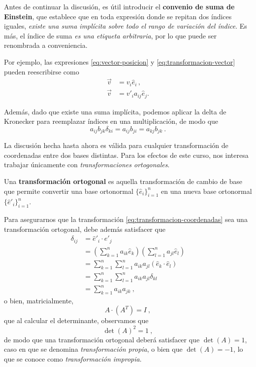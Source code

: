 Antes de continuar la discusión, es útil introducir el  \textbf{convenio de suma de Einstein}, que establece que en toda expresión donde se repitan dos índices iguales, \emph{existe una suma implícita sobre todo el rango de variación del índice}. Es más, el índice de suma \emph{es una etiqueta arbitraria}, por lo que puede ser renombrada a conveniencia.

Por ejemplo, las expresiones \eqref{eq:vector-posicion} y \eqref{eq:transformacion-vector} pueden reescribirse como
\begin{align}
    \vec{v} & = v_i \hat{e}_i \, , \\
    \vec{v} & = v'_i a_{ij} \hat{e}_j .
\end{align}

Además, dado que existe una suma implícita, podemos aplicar la delta de Kronecker para reemplazar índices en una multiplicación, de modo que
\begin{equation}
    a_{ij} b_{jk} \delta_{ki} = a_{ij} b_{ji} = a_{kj} b_{jk} \ .
\end{equation}


La discusión hecha hasta ahora es válida para cualquier transformación de coordenadas entre dos bases distintas. Para los efectos de este curso, nos interesa trabajar únicamente con \emph{transformaciones ortogonales}.

\begin{defi} 
    Una \textbf{transformación ortogonal} es aquella transformación de cambio de base que permite convertir una base ortonormal $\{\hat{e}_i\}_{i=1}^n$ en una nueva base ortonormal $\{\hat{e}'_i\}_{i=1}^n$.
\end{defi}

Para asegurarnos que la transformación \eqref{eq:transformacion-coordenadas} sea una transformación ortogonal, debe además satisfacer que
\begin{align}
    \delta_{ij} & = \hat{e}'_i \cdot \hat{e}'_j \\
    & = \left( \sum_{k=1}^n a_{ik} \hat{e}_k \right) \left( \sum_{l=1}^n a_{jl} \hat{e}_l \right) \\
    & = \sum_{k=1}^n \sum_{l=1}^n a_{ik} a_{jl} (\hat{e}_k \cdot \hat{e}_l) \\
    & = \sum_{k=1}^n \sum_{l=1}^n a_{ik} a_{jl} \delta_{kl} \\
    & = \sum_{k=1}^n a_{ik} a_{jk} \ , \label{eq:delta-transformacion-ortogonal}
\end{align}
o bien, matricialmente,
\begin{equation}\label{eq:condicion-matricial}
    A \cdot (A^T) = I \ ,
\end{equation}
que al calcular el determinante, observamos que
\begin{equation}
    \det(A)^2 = 1 \ , 
\end{equation}
de modo que una transformación ortogonal deberá satisfacer que $\det(A) = 1$, caso en que se denomina \emph{transformación propia}, o bien que $\det(A) = -1$, lo que se conoce como \emph{transformación impropia}.

